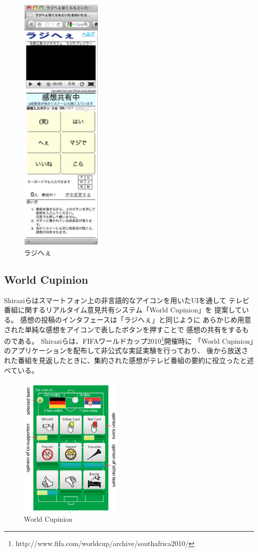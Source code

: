 \begin{figure}[H]
\centering
\includegraphics[width=4cm]{images/rajihe.png}
\caption{ラジへぇ}
\label{rajihe}
\end{figure}


\subsection{World Cupinion}

Shiraziらはスマートフォン上の非言語的なアイコンを用いたUIを通して
テレビ番組に関するリアルタイム意見共有システム「World Cupinion」を
提案している\cite{SahamiShirazi:2011:RNO:1978942.1978985}。
感想の投稿のインタフェースは「ラジへぇ」と同じように
あらかじめ用意された単純な感想をアイコンで表したボタンを押すことで
感想の共有をするものである。
Shiraziらは、FIFAワールドカップ2010\footnote{http://www.fifa.com/worldcup/archive/southafrica2010/}開催時に
「World Cupinion」のアプリケーションを配布して非公式な実証実験を行っており、
後から放送された番組を見返したときに、集約された感想がテレビ番組の要約に役立ったと述べている。


\begin{figure}[H]
\centering
\includegraphics[width=5cm]{images/worldcupinion.png}
\caption{World Cupinion}
\label{worldcupinion}
\end{figure}


